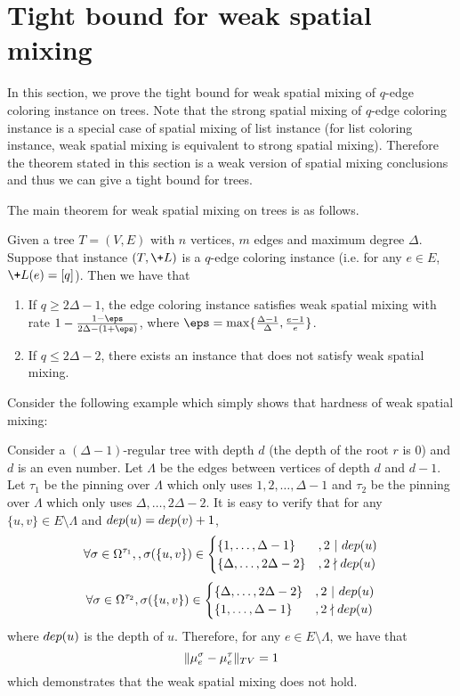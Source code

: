 \documentclass[a4paper,11pt]{article}
\begin{document}
 \section{Tight bound for weak spatial mixing}\label{sec:wsm}
In this section, we prove the tight bound for weak spatial mixing  of $q$-edge coloring instance on trees.
Note that the strong spatial mixing of $q$-edge coloring instance is a special case of spatial mixing of list instance (for list coloring instance, weak spatial mixing is equivalent to strong spatial mixing).
Therefore the theorem stated in this section is a weak version of spatial mixing conclusions and thus we can give a tight bound for trees. 

The main theorem for weak spatial mixing on trees is as follows.
\begin{theorem}\label{thm:tight_WSM}
    Given a tree $T = (V,E)$ with $n$ vertices, $m$ edges and maximum degree $\Delta$.
    Suppose that instance $(T,\+L)$ is a $q$-edge coloring instance (i.e. for any $e\in E$, $\+L(e) = [q]$). 
    Then we have that
    \begin{enumerate}
        \item If $q \geq 2\Delta - 1$, the edge coloring instance satisfies weak spatial mixing with rate $1 - \frac{1 - \eps}{2\Delta - (1+\eps)}$, where $\eps = \max\{\frac{\Delta - 1}{\Delta}, \frac {e - 1}e\}$.
        \item If $q \leq 2\Delta - 2$, there exists an instance that does not satisfy weak spatial mixing.
    \end{enumerate}
\end{theorem}
Consider the following example which simply shows that hardness of weak spatial mixing:
\begin{example}\label{eg:hardness_WSM}
    Consider a $(\Delta - 1)$-regular tree with depth $d$ (the depth of the root $r$ is $0$) and $d$ is an even number. Let $\Lambda$ be the edges between vertices of depth $d$ and $d-1$. Let $\tau_1$ be the pinning over $\Lambda$ which only uses $1,2,\dots,\Delta-1$ and $\tau_2$ be the pinning over $\Lambda$ which only uses $\Delta,\dots,2\Delta - 2$. It is easy to verify that for any $\{u,v\}\in E\setminus \Lambda$ and $\-{dep}(u) = \-{dep}(v) + 1$,
    $$
        \forall \sigma \in \Omega^{\tau_1}, , \sigma(\{u,v\}) \in 
        \begin{cases}
            \{1,\dots,\Delta-1\} &, 2\ |\ \-{dep}(u)
            \\\{\Delta,\dots,2\Delta-2\} &, 2 \nmid \-{dep}(u)
        \end{cases}
    $$
    $$
        \forall \sigma \in \Omega^{\tau_2}, \sigma(\{u,v\}) \in 
        \begin{cases}
            \{\Delta,\dots,2\Delta-2\} &, 2\ |\ \-{dep}(u)
            \\\{1,\dots,\Delta-1\} &, 2 \nmid \-{dep}(u)
        \end{cases}
    $$
    where $\-{dep}(u)$ is the depth of $u$. Therefore, for any $e\in E\setminus \Lambda$, we have that
    $$
        \|\mu_e^\sigma - \mu_e^\tau\|_{\-{TV}} = 1
    $$
    which demonstrates that the weak spatial mixing does not hold.
\end{example}
\end{document}
